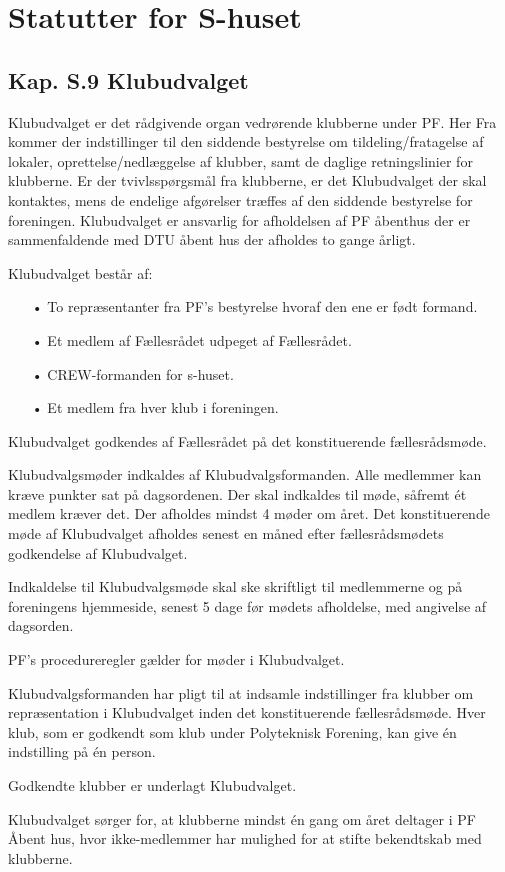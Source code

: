 \section*{Statutter for S-huset}
\subsection{Kap. S.9 Klubudvalget}
\label{s:klubudvalget}
\begin{list}
\item Klubudvalget er det rådgivende organ vedrørende klubberne under PF. Her Fra kommer der indstillinger til den siddende bestyrelse om tildeling/fratagelse af lokaler, oprettelse/nedlæggelse af klubber, samt de daglige retningslinier for klubberne. Er der tvivlsspørgsmål fra klubberne, er det Klubudvalget der skal kontaktes, mens de endelige afgørelser træffes af den siddende bestyrelse for foreningen. Klubudvalget er ansvarlig for afholdelsen af PF åbenthus der er sammenfaldende med DTU åbent hus der afholdes to gange årligt.
\item Klubudvalget består af:
	\begin{enumerate}
	\item[•] To repræsentanter fra PF’s bestyrelse hvoraf den ene er født formand.
	\item[•] Et medlem af Fællesrådet udpeget af Fællesrådet.
	\item[•] CREW-formanden for s-huset.
	\item[•] Et medlem fra hver klub i foreningen.
	\end{enumerate}
\item Klubudvalget godkendes af Fællesrådet på det konstituerende fællesrådsmøde.
\item Klubudvalgsmøder indkaldes af Klubudvalgsformanden. Alle medlemmer kan kræve punkter sat på dagsordenen. Der skal indkaldes til møde, såfremt ét medlem kræver det. Der afholdes mindst 4 møder om året. Det konstituerende møde af Klubudvalget afholdes senest en måned efter fællesrådsmødets godkendelse af Klubudvalget.
\item Indkaldelse til Klubudvalgsmøde skal ske skriftligt til medlemmerne og på foreningens hjemmeside, senest 5 dage før mødets afholdelse, med angivelse af dagsorden.
\item PF's procedureregler gælder for møder i Klubudvalget.
\item Klubudvalgsformanden har pligt til at indsamle indstillinger fra klubber om repræsentation i Klubudvalget inden det konstituerende fællesrådsmøde. Hver klub, som er godkendt som klub under Polyteknisk Forening, kan give én indstilling på én person.
\item Godkendte klubber er underlagt Klubudvalget.
\item Klubudvalget sørger for, at klubberne mindst én gang om året deltager i PF Åbent hus, hvor ikke-medlemmer har mulighed for at stifte bekendtskab med klubberne.\\
\\

\end{list}
